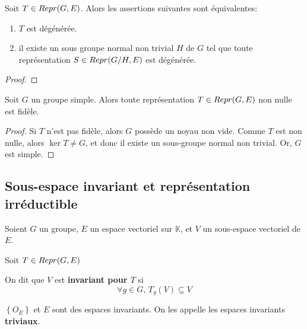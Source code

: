 \begin{proposition}
	Soit $T \in Repr(G, E)$.
	Alors les assertions suivantes sont équivalentes:
	\begin{enumerate}
		\item $T$ est dégénérée.
		\item il existe un sous groupe normal non trivial $H$ de $G$ tel que
			toute représentation $S \in Repr(G/H, E)$ est dégénérée.
	\end{enumerate}
\end{proposition}

\ifdefined\outputproof
\begin{proof}

\end{proof}
\fi

\begin{corollary}
	Soit $G$ un groupe simple. Alors toute représentation $T \in Repr(G, E)$
	non nulle est fidèle.
\end{corollary}

\ifdefined\outputproof
\begin{proof}
	Si $T$ n'est pas fidèle, alors $G$ possède un noyau non vide. Comme $T$ est
	non nulle, alors $\ker{T} \neq G$, et donc il existe un sous-groupe normal
	non trivial. Or, $G$ est simple.
\end{proof}
\fi

\subsection{Sous-espace invariant et représentation irréductible}

\begin{definition} 
	Soient $G$ un groupe, $E$ un espace vectoriel sur $\mathbb{K}$, et $V$ un sous-espace
	vectoriel de $E$.

	Soit $T \in Repr(G, E)$

	On dit que $V$ est \textbf{invariant pour $T$} si
	\begin{equation}
		\forall g \in G, \, T_{g}(V) \subseteq V
		\label{definition_invariant_subspace}
	\end{equation}
\end{definition}

\begin{proposition}
	$\left\{ O_{E} \right\}$ et $E$ sont des espaces invariants. On les appelle
	les espaces invariants \textbf{triviaux}.
\end{proposition}

